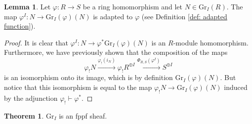 \documentclass[oneside,11pt]{amsart}
\newcommand{\Gr}{\ensuremath{\text{Gr}}}
\theoremstyle{definition}
\newtheorem{proof techniques}{Proof Techniques}
\newtheorem{lemma}{Lemma}
\newtheorem{theorem}{Theorem}
\begin{document}

\begin{lemma} \label{lem: power of phi is adapted}
Let $\varphi : R \to S$ be a ring homomorphism and let $N \in \Gr_I(R)$. The map $\varphi^I : N \to \Gr_I(\varphi)(N)$ is adapted to $\varphi$ (see Definition \ref{def: adapted function}). 
\end{lemma}

\begin{proof}
It is clear that $\varphi^I : N \to \varphi^* \Gr_I(\varphi)(N)$ is an $R$-module homomorphism. Furthermore, we have previously shown that the composition of the maps 
\begin{equation*}
\varphi_! N \overset{\varphi_!(i_N)}{\longrightarrow} \varphi_! R^{\oplus I} \overset{\Phi_{R , S}(\varphi^I)}{\longrightarrow} S^{\oplus I}
\end{equation*}
is an isomorphism onto its image, which is by definition $\Gr_I(\varphi)(N)$. But notice that this isomorphism is equal to the map $\varphi_! N \to \Gr_I(\varphi)(N)$ induced by the adjunction $\varphi_! \vdash \varphi^*$.
\end{proof}



\begin{theorem} \label{thm: grassmannian is an fppf sheaf}
$\Gr_I$ is an fppf sheaf.
\end{theorem}
\end{document}
